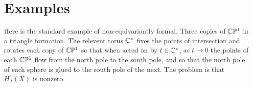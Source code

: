 \documentclass[12pt]{article}
\begin{document}
\section{Examples}

\begin{example}[nonexample]
Here is the standard example of non-equivariantly formal. 
Three copies of $\mathbb{C}\mathbb{P}^1$ in a triangle formation. The relevent torus $\mathbb{C}^*$
fixes the points of intersection and rotates each copy of $\mathbb{C}\mathbb{P}^1$ so that when acted on by $t\in\mathbb{C}^*$,
as $t\to 0$ the points of each $\mathbb{C}\mathbb{P}^1$ flow from the north pole to the south pole, 
and so that the north pole of each sphere is glued to the south pole of the next.
The problem is that $H^1_T(X)$ is nonzero.

\end{example}
\end{document}
